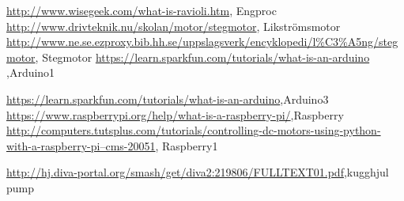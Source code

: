 \documentclass[11pt,a4paper,oneside]{book}
\begin{document}
\backmatter
 
\begin{thebibliography}{1}
\href{http://www.wisegeek.com/what-is-ravioli.htm}{http://www.wisegeek.com/what-is-ravioli.htm}, Engproc
\href{http://www.drivteknik.nu/skolan/motor/stegmotor}{http://www.drivteknik.nu/skolan/motor/stegmotor}, Likströmsmotor
\href{http://www.ne.se.ezproxy.bib.hh.se/uppslagsverk/encyklopedi/l\%C3\%A5ng/stegmotor}{http://www.ne.se.ezproxy.bib.hh.se/uppslagsverk/encyklopedi/l\%C3\%A5ng/stegmotor}, Stegmotor
\href{https://learn.sparkfun.com/tutorials/what-is-an-arduino}{https://learn.sparkfun.com/tutorials/what-is-an-arduino },Arduino1

\href{https://learn.sparkfun.com/tutorials/what-is-an-arduino}{https://learn.sparkfun.com/tutorials/what-is-an-arduino},Arduino3
\href{https://www.raspberrypi.org/help/what-is-a-raspberry-pi/}{https://www.raspberrypi.org/help/what-is-a-raspberry-pi/},Raspberry
\href{http://computers.tutsplus.com/tutorials/controlling-dc-motors-using-python-with-a-raspberry-pi--cms-20051}{http://computers.tutsplus.com/tutorials/controlling-dc-motors-using-python-with-a-raspberry-pi--cms-20051}, Raspberry1

\href{http://hj.diva-portal.org/smash/get/diva2:219806/FULLTEXT01.pdf}{http://hj.diva-portal.org/smash/get/diva2:219806/FULLTEXT01.pdf},kugghjul pump
\end{thebibliography}
\end{document}
